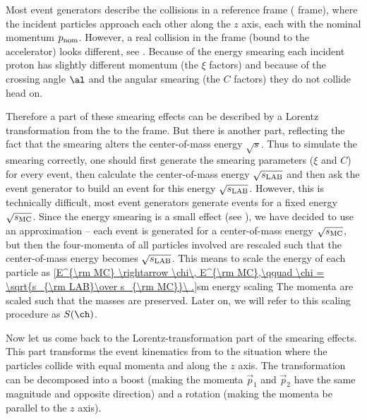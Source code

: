 Most event generators describe the collisions in a reference frame ( frame), where the incident particles approach each other along the $z$ axis, each with the nominal momentum $p_{\rm nom}$. However, a real collision in the  frame (bound to the accelerator) looks different, see . Because of the energy smearing each incident proton has slightly different momentum (the $\xi$ factors) and because of the crossing angle $\al$ and the angular smearing (the $C$ factors) they do not collide head on.


Therefore a part of these smearing effects can be described by a Lorentz transformation from the  to the  frame. But there is another part, reflecting the fact that the smearing alters the center-of-mass energy $\sqrt s$. Thus to simulate the smearing correctly, one should first generate the smearing parameters ($\xi$ and $C$) for every event, then calculate the center-of-mass energy $\sqrt{s_{\rm LAB}}$ and then ask the event generator to build an event for this energy $\sqrt{s_{\rm LAB}}$. However, this is technically difficult, most event generators generate events for a fixed energy $\sqrt{s_{\rm MC}}$. Since the energy smearing is a small effect (see ), we have decided to use an approximation -- each event is generated for a center-of-mass energy $\sqrt{s_{\rm MC}}$, but then the four-momenta of all particles involved are rescaled such that the center-of-mass energy becomes $\sqrt{s_{\rm LAB}}$. This means to scale the energy of each particle as
\eqref{E^{\rm MC} \rightarrow \chi\, E^{\rm MC},\qquad \chi = \sqrt{s_{\rm LAB}\over s_{\rm MC}}\ .}{sm energy scaling}
The momenta are scaled such that the masses are preserved. Later on, we will refer to this scaling procedure as $S(\ch)$.

Now let us come back to the Lorentz-transformation part of the smearing effects. This part transforms the event kinematics from  to the situation where the particles collide with equal momenta and along the $z$ axis. The transformation can be decomposed into a boost (making the momenta $\vec p_1$ and $\vec p_2$ have the same magnitude and opposite direction) and a rotation (making the momenta be parallel to the $z$ axis).

